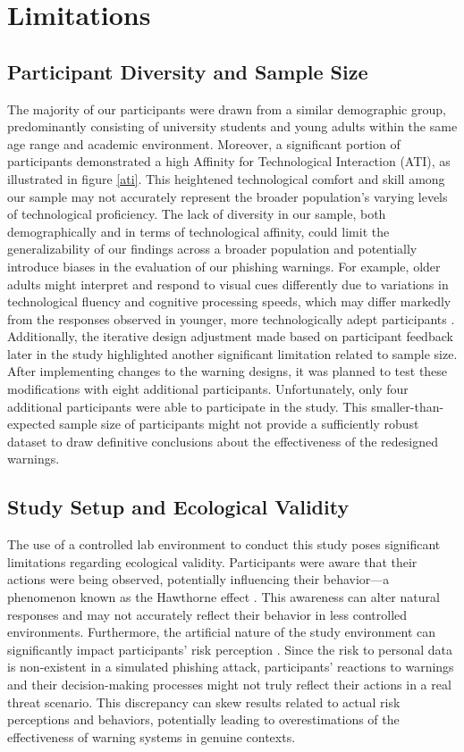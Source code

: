 \documentclass[
  a4paper,  %
  twoside,  %
  bibliography=totoc,
  headsepline,
  cleardoublepage=empty,
  parskip=half,
  draft=false
]{scrbook}
\begin{document}
\section{Limitations}

\subsection{Participant Diversity and Sample Size}
The majority of our participants were drawn from a similar demographic group, predominantly consisting of university students and young adults within the same age range and academic environment. Moreover, a significant portion of participants demonstrated a high Affinity for Technological Interaction (ATI), as illustrated in figure \ref{ati}. This heightened technological comfort and skill among our sample may not accurately represent the broader population's varying levels of technological proficiency. The lack of diversity in our sample, both demographically and in terms of technological affinity, could limit the generalizability of our findings across a broader population and potentially introduce biases in the evaluation of our phishing warnings. For example, older adults might interpret and respond to visual cues differently due to variations in technological fluency and cognitive processing speeds, which may differ markedly from the responses observed in younger, more technologically adept participants \cite{age}. \newline
Additionally, the iterative design adjustment made based on participant feedback later in the study highlighted another significant limitation related to sample size. After implementing changes to the warning designs, it was planned to test these modifications with eight additional participants. Unfortunately, only four additional participants were able to participate in the study. This smaller-than-expected sample size of participants might not provide a sufficiently robust dataset to draw definitive conclusions about the effectiveness of the redesigned warnings.

\subsection{Study Setup and Ecological Validity}
The use of a controlled lab environment to conduct this study poses significant limitations regarding ecological validity. Participants were aware that their actions were being observed, potentially influencing their behavior—a phenomenon known as the Hawthorne effect \cite{jim}. This awareness can alter natural responses and may not accurately reflect their behavior in less controlled environments. \newline
Furthermore, the artificial nature of the study environment can significantly impact participants' risk perception \cite{garfinkel}. Since the risk to personal data is non-existent in a simulated phishing attack, participants' reactions to warnings and their decision-making processes might not truly reflect their actions in a real threat scenario. This discrepancy can skew results related to actual risk perceptions and behaviors, potentially leading to overestimations of the effectiveness of warning systems in genuine contexts.
\end{document}
